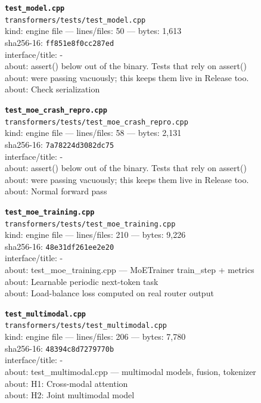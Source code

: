 \noindent\textbf{\texttt{test\_model.cpp}}\\
\texttt{transformers/tests/test\_model.cpp}\\
kind: engine file --- lines/files: 50 --- bytes: 1,613\\
sha256-16: \texttt{ff851e8f0cc287ed}\\
interface/title: -\\
about: assert() below out of the binary. Tests that rely on assert()\\
about: were passing vacuously; this keeps them live in Release too.\\
about: Check serialization\\
\vspace*{6.0pt}

\noindent\textbf{\texttt{test\_moe\_crash\_repro.cpp}}\\
\texttt{transformers/tests/test\_moe\_crash\_repro.cpp}\\
kind: engine file --- lines/files: 58 --- bytes: 2,131\\
sha256-16: \texttt{7a78224d3082dc75}\\
interface/title: -\\
about: assert() below out of the binary. Tests that rely on assert()\\
about: were passing vacuously; this keeps them live in Release too.\\
about: Normal forward pass\\
\vspace*{6.0pt}
\newpage

\noindent\textbf{\texttt{test\_moe\_training.cpp}}\\
\texttt{transformers/tests/test\_moe\_training.cpp}\\
kind: engine file --- lines/files: 210 --- bytes: 9,226\\
sha256-16: \texttt{48e31df261ee2e20}\\
interface/title: -\\
about: test\_moe\_training.cpp — MoETrainer train\_step + metrics\\
about: Learnable periodic next-token task\\
about: Load-balance loss computed on real router output\\
\vspace*{6.0pt}

\noindent\textbf{\texttt{test\_multimodal.cpp}}\\
\texttt{transformers/tests/test\_multimodal.cpp}\\
kind: engine file --- lines/files: 206 --- bytes: 7,780\\
sha256-16: \texttt{48394c8d7279770b}\\
interface/title: -\\
about: test\_multimodal.cpp — multimodal models, fusion, tokenizer\\
about: H1: Cross-modal attention\\
about: H2: Joint multimodal model\\
\vspace*{6.0pt}

